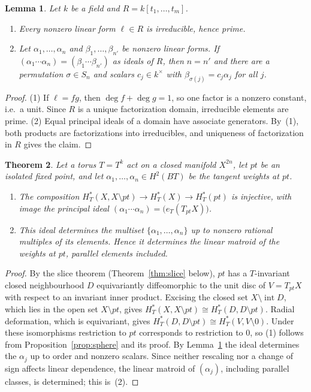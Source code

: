\documentclass[11pt,a4paper]{article}
\numberwithin{equation}{section}
\theoremstyle{plain}
\newtheorem{theorem}{Theorem}[section]
\newtheorem{lemma}[theorem]{Lemma}
\theoremstyle{definition}
\theoremstyle{remark}
\newcommand{\HT}{H^{*}_{T}}
\begin{document}
\begin{lemma}\label{lem:ufd}
Let $k$ be a field and $R=k[t_1,\dots,t_m]$.
\begin{enumerate}[nosep,label=(\arabic*)]
\item Every nonzero linear form $\ell\in R$ is irreducible, hence prime.
\item Let $\alpha_1,\dots,\alpha_n$ and $\beta_1,\dots,\beta_{n'}$ be nonzero linear forms. If $(\alpha_1\cdots\alpha_n)=(\beta_1\cdots\beta_{n'})$ as ideals of $R$, then $n=n'$ and there are a permutation $\sigma\in S_n$ and scalars $c_j\in k^\times$ with $\beta_{\sigma(j)}=c_j\alpha_j$ for all $j$.
\end{enumerate}
\end{lemma}
\begin{proof}
(1) If $\ell=fg$, then $\deg f+\deg g=1$, so one factor is a nonzero constant, i.e.\ a unit. Since $R$ is a unique factorization domain, irreducible elements are prime. (2) Equal principal ideals of a domain have associate generators. By~(1), both products are factorizations into irreducibles, and uniqueness of factorization in $R$ gives the claim.
\end{proof}

\begin{theorem}\label{thm:main}
Let a torus $T=T^k$ act on a closed manifold $X^{2n}$, let $pt$ be an isolated fixed point, and let $\alpha_1,\dots,\alpha_n\in H^2(BT)$ be the tangent weights at $pt$.
\begin{enumerate}[nosep,label=(\arabic*)]
\item The composition $\HT(X,X\setminus pt)\to\HT(X)\to\HT(pt)$ is injective, with image the principal ideal $(\alpha_1\cdots\alpha_n)=\bigl(e_T(T_{pt}X)\bigr)$.
\item This ideal determines the multiset $\{\alpha_1,\dots,\alpha_n\}$ up to nonzero rational multiples of its elements. Hence it determines the linear matroid of the weights at $pt$, parallel elements included.
\end{enumerate}
\end{theorem}
\begin{proof}
By the slice theorem (Theorem~\ref{thm:slice} below), $pt$ has a $T$-invariant closed neighbourhood $D$ equivariantly diffeomorphic to the unit disc of $V=T_{pt}X$ with respect to an invariant inner product. Excising the closed set $X\setminus\operatorname{int}D$, which lies in the open set $X\setminus pt$, gives $\HT(X,X\setminus pt)\cong\HT(D,D\setminus pt)$. Radial deformation, which is equivariant, gives $\HT(D,D\setminus pt)\cong\HT(V,V\setminus0)$. Under these isomorphisms restriction to $pt$ corresponds to restriction to $0$, so (1) follows from Proposition~\ref{prop:sphere} and its proof. By Lemma~\ref{lem:ufd} the ideal determines the $\alpha_j$ up to order and nonzero scalars. Since neither rescaling nor a change of sign affects linear dependence, the linear matroid of $(\alpha_j)$, including parallel classes, is determined; this is~(2).
\end{proof}
\end{document}
